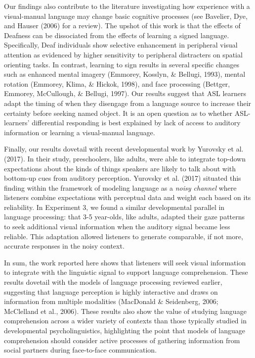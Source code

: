 \documentclass[english,floatsintext,man]{apa6}
\begin{document}
Our findings also contribute to the literature investigating how
experience with a visual-manual language may change basic cognitive
processes (see Bavelier, Dye, and Hauser (2006) for a review). The
upshot of this work is that the effects of Deafness can be dissociated
from the effects of learning a signed language. Specifically, Deaf
individuals show selective enhancement in peripheral visual attention as
evidenced by higher sensitivity to peripheral distracters on spatial
orienting tasks. In contrast, learning to sign results in several
specific changes such as enhanced mental imagery (Emmorey, Kosslyn, \&
Bellugi, 1993), mental rotation (Emmorey, Klima, \& Hickok, 1998), and
face processing (Bettger, Emmorey, McCullough, \& Bellugi, 1997). Our
results suggest that ASL learners adapt the timing of when they
disengage from a language source to increase their certainty before
seeking named object. It is an open question as to whether ASL-learners'
differential responding is best explained by lack of access to auditory
information or learning a visual-manual language.

Finally, our results dovetail with recent developmental work by Yurovsky
et al. (2017). In their study, preschoolers, like adults, were able to
integrate top-down expectations about the kinds of things speakers are
likely to talk about with bottom-up cues from auditory perception.
Yurovsky et al. (2017) situated this finding within the framework of
modeling language as a \emph{noisy channel} where listeners combine
expectations with perceptual data and weight each based on its
reliability. In Experiment 3, we found a similar developmental parallel
in language processing: that 3-5 year-olds, like adults, adapted their
gaze patterns to seek additional visual information when the auditory
signal became less reliable. This adaptation allowed listeners to
generate comparable, if not more, accurate responses in the noisy
context.

In sum, the work reported here shows that listeners will seek visual
information to integrate with the linguistic signal to support language
comprehension. These results dovetail with the models of language
processing reviewed earlier, suggesting that language perception is
highly interactive and draws on information from multiple modalities
(MacDonald \& Seidenberg, 2006; McClelland et al., 2006). These results
also show the value of studying language comprehension across a wider
variety of contexts than those typically studied in developmental
psycholinguistics, highlighting the point that models of language
comprehension should consider active processes of gathering information
from social partners during face-to-face communication.
\end{document}
